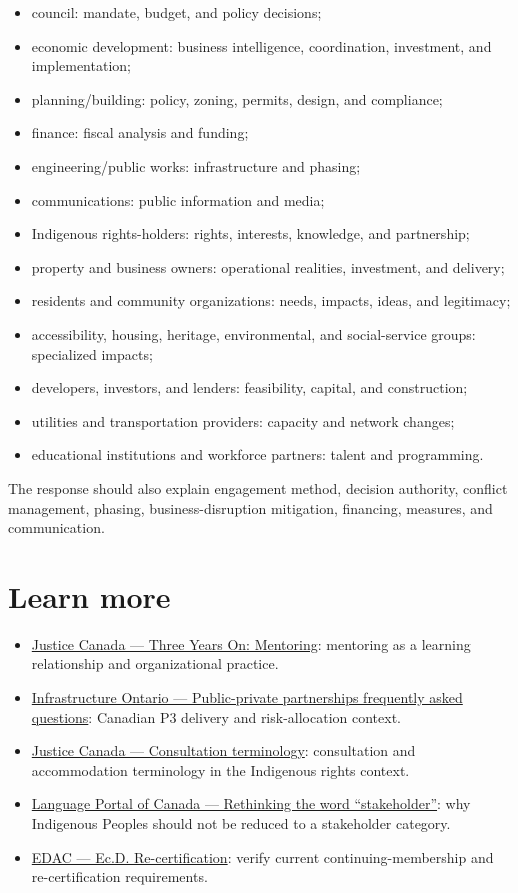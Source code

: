 \documentclass[11pt,letterpaper,oneside,openany]{book}
\newif\ifsectionhasicon
\newcommand{\currentsectionicon}{}
\newcommand{\marginsection}[2]{%
  \begingroup
  \sectionhasicontrue
  \def\currentsectionicon{#1}%
  \section[#2]{#2}%
  \endgroup
}
\begin{document}
\begin{itemize}
\item council: mandate, budget, and policy decisions;
\item economic development: business intelligence, coordination, investment, and implementation;
\item planning/building: policy, zoning, permits, design, and compliance;
\item finance: fiscal analysis and funding;
\item engineering/public works: infrastructure and phasing;
\item communications: public information and media;
\item Indigenous rights-holders: rights, interests, knowledge, and partnership;
\item property and business owners: operational realities, investment, and delivery;
\item residents and community organizations: needs, impacts, ideas, and legitimacy;
\item accessibility, housing, heritage, environmental, and social-service groups: specialized impacts;
\item developers, investors, and lenders: feasibility, capital, and construction;
\item utilities and transportation providers: capacity and network changes;
\item educational institutions and workforce partners: talent and programming.
\end{itemize}


The response should also explain engagement method, decision authority, conflict management, phasing, business-disruption mitigation, financing, measures, and communication.


\marginsection{external-link}{Learn more}
\begin{itemize}
\item \href{https://justice.canada.ca/eng/rp-pr/other-autre/rr12\_1/p1.html}{Justice Canada --- Three Years On: Mentoring}: mentoring as a learning relationship and organizational practice.
\item \href{https://www.infrastructureontario.ca/en/what-we-do/capital-delivery/faqs---public-private-partnerships-p3s/}{Infrastructure Ontario --- Public-private partnerships frequently asked questions}: Canadian P3 delivery and risk-allocation context.
\item \href{https://justice.canada.ca/eng/cons/def.html}{Justice Canada --- Consultation terminology}: consultation and accommodation terminology in the Indigenous rights context.
\item \href{https://our-languages.canada.ca/en/blogue-blog/rethinking-the-word-stakeholder-eng}{Language Portal of Canada --- Rethinking the word ``stakeholder''}: why Indigenous Peoples should not be reduced to a stakeholder category.
\item \href{https://edac.ca/professional-development/ec-d-recertification/}{EDAC --- Ec.D. Re-certification}: verify current continuing-membership and re-certification requirements.
\end{itemize}
\end{document}
